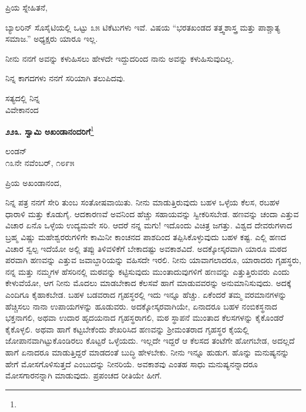 \vspace{-0.3cm}

\noindent
ಪ್ರಿಯ ಸ್ನೇಹಿತನೆ,

ಬ್ಯಾಲರಿನ್ ಸೊಸೈಟಿಯಲ್ಲಿ ಒಟ್ಟು ೩೫ ಟಿಕೆಟುಗಳು ಇವೆ. ವಿಷಯ “ಭರತಖಂಡದ ತತ್ತ್ವಶಾಸ್ತ್ರ ಮತ್ತು ಪಾಶ್ಚಾತ್ಯ ಸಮಾಜ.” ಅಧ್ಯಕ್ಷರು ಯಾರೂ ಇಲ್ಲ.

ನೀನು ನನಗೆ ಅವನ್ನು ಕಳುಹಿಸಲು ಹೇಳದೇ ಇದ್ದುದರಿಂದ ನಾನು ಅವನ್ನು ಕಳುಹಿಸುವುದಿಲ್ಲ.

ನಿನ್ನ ಕಾಗದಗಳು ನನಗೆ ಸರಿಯಾಗಿ ತಲುಪಿದವು.

\vspace{-0.5cm}

{\flushright
ಸತ್ಯದಲ್ಲಿ ನಿನ್ನ\\ವಿವೇಕಾನಂದ\par}

\begin{center}
\textbf{೨೨೩. ಸ್ವಾಮಿ ಅಖಂಡಾನಂದರಿಗೆ}\footnote{}
\end{center}

\vspace{-0.6cm}

\begin{flushright}
ಲಂಡನ್\\೧೩ನೇ ನವೆಂಬರ್, ೧೮೯೫
\end{flushright}

\vspace{-0.3cm}

\noindent
ಪ್ರಿಯ ಅಖಂಡಾನಂದ,

ನಿನ್ನ ಪತ್ರ ನನಗೆ ಸೇರಿ ತುಂಬ ಸಂತೋಷವಾಯಿತು. ನೀನು ಮಾಡುತ್ತಿರುವುದು ಬಹಳ ಒಳ್ಳೆಯ ಕೆಲಸ, ರ\enginline{-}ಬಹಳ ಧಾರಾಳಿ ಮತ್ತು ಕೊಡುಗೈ. ಆದಕಾರಣವೆ ಅವನಿಂದ ಹೆಚ್ಚು ಸಹಾಯವನ್ನು ಸ್ವೀಕರಿಸಬೇಡ. ಹಣವನ್ನು ಚಂದಾ ಎತ್ತುವ ವಿಚಾರ ಏನೊ ಒಳ್ಳೆಯ ಉದ್ಯಮವೇ ಸರಿ. ಆದರೆ ನನ್ನ ಮಗು! ಇದೊಂದು ವಿಚಿತ್ರ ಜಗತ್ತು. ವಿಶ್ವದ ದೇವರುಗಳಾದ ಬ್ರಹ್ಮ ವಿಷ್ಣು ಮಹೇಶ್ವರರುಗಳಿಗೇ ಕಾಮಿನೀ ಕಾಂಚನದ ಪಾಶದಿಂದ ತಪ್ಪಿಸಿಕೊಳ್ಳುವುದು ಬಹಳ ಕಷ್ಟ. ಎಲ್ಲಿ ಹಣದ ವಿಚಾರ ಸ್ವಲ್ಪ ಇದೆಯೋ ಅಲ್ಲಿ ತಪ್ಪು ತಿಳಿವಳಿಕೆಗೆ ಬೇಕಾದಷ್ಟು ಅವಕಾಶವಿದೆ. ಅದಕ್ಕೋಸ್ಕರವಾಗಿ ಯಾರೂ ಮಠದ ಪರವಾಗಿ ಹಣವನ್ನು ಎತ್ತುವ ಜವಾಬ್ದಾರಿಯನ್ನು ವಹಿಸದೇ ಇರಲಿ. ನೀನು ಯಾವಾಗಲಾದರೂ, ಯಾರಾದರು ಗೃಹಸ್ಥರು, ನನ್ನ ಮತ್ತು ನಮ್ಮಗಳ ಹೆಸರಿನಲ್ಲಿ ಮಠವನ್ನು ಕಟ್ಟಿಸುವುದು ಮುಂತಾದುವುಗಳಿಗೆ ಹಣವನ್ನು ಎತ್ತುತ್ತಿರುವರು ಎಂದು ಕೇಳುವೆಯೋ, ಆಗ ನೀನು ಮೊದಲು ಮಾಡಬೇಕಾದ ಕೆಲಸವೆ ಹಾಗೆ ಮಾಡುವವರನ್ನು ಅನುಮಾನಿಸುವುದು. ಅದಕ್ಕೆ ಎಂದಿಗೂ ಕೈಹಾಕಬೇಡ. ಬಹಳ ಬಡವರಾದ ಗೃಹಸ್ಥರಲ್ಲಿ ಇದು ಇನ್ನೂ ಹೆಚ್ಚು. ಏಕೆಂದರೆ ತಮ್ಮ ವರಮಾನಗಳನ್ನು ಹೆಚ್ಚಿಸಲು ನಾನಾ ಉಪಾಯಗಳನ್ನು ಹೂಡುವರು. ಅದಕ್ಕೋಸ್ಕರವಾಗಿಯೇ, ಏನಾದರೂ ಬಹಳ ನಂಬಿಕಸ್ಥನಾದ ಭಕ್ತನಾಗಲಿ, ಅಥವಾ ಉದಾರ ಹೃದಯನಾದ ಗೃಹಸ್ಥರಾಗಲಿ, ಮಠ ಸ್ಥಾಪನೆ ಮುಂತಾದ ಕೆಲಸಗಳನ್ನು ಕೈಕೊಂಡರೆ ಕೈಕೊಳ್ಳಲಿ. ಅಥವಾ ಹಾಗೆ ಕಟ್ಟಬೇಕೆಂದು ಶೇಖರಿಸಿದ ಹಣವನ್ನು ಶ‍್ರೀಮಂತರಾದ ಗೃಹಸ್ಥರ ಕೈಯಲ್ಲಿ ಜೋಪಾನವಾಗಿಟ್ಟುಕೊಂಡಿರಲು ಕೊಟ್ಟರೆ ಒಳ್ಳೆಯದು. ಇಲ್ಲದೇ ಇದ್ದರೆ ಆ ಕೆಲಸದ ತಂಟೆಗೇ ಹೋಗಬೇಡ, ಅದಲ್ಲದೆ ಹಾಗೆ ಏನಾದರೂ ಮಾಡುತ್ತಿದ್ದರೆ ಮಾಡದಂತೆ ಬುದ್ಧಿ ಹೇಳಬೇಕು. ನೀನು ಇನ್ನೂ ಹುಡುಗ. ಹೊನ್ನು ಮನುಷ್ಯನನ್ನು ಹೇಗೆ ಮೋಸಗೊಳಿಸುತ್ತದೆ ಎಂಬುದನ್ನು ನೀನರಿಯೆ. ಅವಕಾಶವು ಎಂತಹ ಸಾಧು ಮನುಷ್ಯನನ್ನಾದರೂ ಮೋಸಗಾರನನ್ನಾಗಿ ಮಾಡುವುದು. ಪ್ರಪಂಚದ ರೀತಿಯೇ ಹೀಗೆ.

